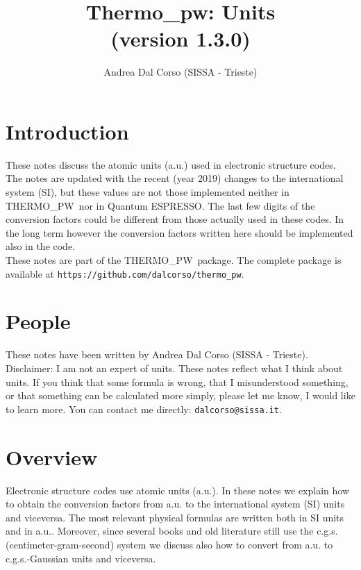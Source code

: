 \documentclass[12pt,a4paper]{article}
\def\version{1.3.0}
\def\qe{{\sc Quantum ESPRESSO}}
\def\tpw{{\sc THERMO\_PW}}
\begin{document}
 
\author{Andrea Dal Corso (SISSA - Trieste)}
\date{}


\title{
  \vskip 1cm
  {\color{red} \Huge Thermo\_pw: Units} \\
  \Large (version \version)
}

\maketitle

\newpage

\tableofcontents

\newpage

\section{\color{coral}Introduction}
These notes discuss the atomic units (a.u.) used in 
electronic structure codes. The notes are updated with the recent 
(year 2019) changes to the international system (SI), but these  
values are not those implemented neither in \tpw\ nor in \qe. The 
last few digits of the conversion factors could be different from 
those actually used in these codes. In the long term however the 
conversion factors written here should be implemented also in the code. \\
These notes are part of the \tpw\ package. The complete package is
available at \texttt{https://github.com/dalcorso/thermo\_pw}.

\newpage
\section{\color{coral}People}
These notes have been written by Andrea Dal Corso (SISSA - Trieste). \\
Disclaimer: I am not an expert of units. 
These notes reflect what I think about units.
If you think that some formula is wrong, that I misunderstood something, or 
that something can be calculated more simply, please let me know, I would 
like to learn more. 
You can contact me directly: \texttt{dalcorso@sissa.it}. 

\newpage
\section{\color{coral}Overview}
Electronic structure codes use atomic units (a.u.). 
In these notes we explain how to obtain the conversion factors 
from a.u. to the international system (SI) units and viceversa. 
The most relevant physical formulas are written both in SI units 
and in a.u.. Moreover, since several books and old literature still 
use the c.g.s. (centimeter-gram-second) system we discuss also how 
to convert from a.u. to c.g.s.-Gaussian units and viceversa.
\end{document}
